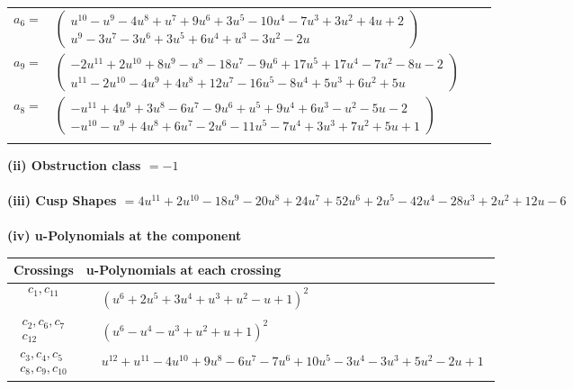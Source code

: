 \documentclass[1p]{elsarticle_modified}
\theoremstyle{definition}
\begin{document}
\begin{tabular}{m{7pt} m{180pt} m{7pt} m{180pt} }
\flushright $a_{6}=$&$\begin{pmatrix}u^{10}- u^9-4 u^8+u^7+9 u^6+3 u^5-10 u^4-7 u^3+3 u^2+4 u+2\\u^9-3 u^7-3 u^6+3 u^5+6 u^4+u^3-3 u^2-2 u\end{pmatrix}$ \\
\flushright $a_{9}=$&$\begin{pmatrix}-2 u^{11}+2 u^{10}+8 u^9- u^8-18 u^7-9 u^6+17 u^5+17 u^4-7 u^2-8 u-2\\u^{11}-2 u^{10}-4 u^9+4 u^8+12 u^7-16 u^5-8 u^4+5 u^3+6 u^2+5 u\end{pmatrix}$ \\
\flushright $a_{8}=$&$\begin{pmatrix}- u^{11}+4 u^9+3 u^8-6 u^7-9 u^6+u^5+9 u^4+6 u^3- u^2-5 u-2\\- u^{10}- u^9+4 u^8+6 u^7-2 u^6-11 u^5-7 u^4+3 u^3+7 u^2+5 u+1\end{pmatrix}$\\&\end{tabular}
\flushleft \textbf{(ii) Obstruction class $= -1$}\\~\\
\flushleft \textbf{(iii) Cusp Shapes $= 4 u^{11}+2 u^{10}-18 u^9-20 u^8+24 u^7+52 u^6+2 u^5-42 u^4-28 u^3+2 u^2+12 u-6$}\\~\\
\newpage\renewcommand{\arraystretch}{1}
\flushleft \textbf{(iv) u-Polynomials at the component}\newline \\
\begin{tabular}{m{50pt}|m{274pt}}
Crossings & \hspace{64pt}u-Polynomials at each crossing \\
\hline $$\begin{aligned}c_{1},c_{11}\end{aligned}$$&$\begin{aligned}
&(u^6+2 u^5+3 u^4+u^3+u^2- u+1)^2
\end{aligned}$\\
\hline $$\begin{aligned}c_{2},c_{6},c_{7}\\c_{12}\end{aligned}$$&$\begin{aligned}
&(u^6- u^4- u^3+u^2+u+1)^2
\end{aligned}$\\
\hline $$\begin{aligned}c_{3},c_{4},c_{5}\\c_{8},c_{9},c_{10}\end{aligned}$$&$\begin{aligned}
&u^{12}+u^{11}-4 u^{10}+9 u^8-6 u^7-7 u^6+10 u^5-3 u^4-3 u^3+5 u^2-2 u+1
\end{aligned}$\\
\hline
\end{tabular}\\~\\
\end{document}
